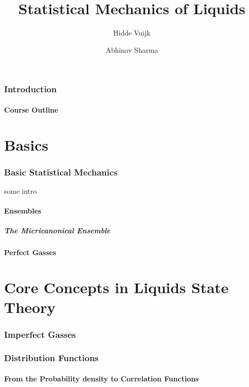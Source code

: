 \documentclass[a4paper,11pt]{article}
\title{Statistical Mechanics of Liquids}
\author[a]{Hidde Vuijk}
\author[a,b]{Abhinav Sharma}
\affiliation[a]{Leibniz-Institut f\"ur Polymerforschung, Dresden, Germany}
\affiliation[b]{TU Dresden}
\begin{document}
 
\maketitle
\flushbottom

\newpage
\section{Introduction}
\subsection{Course Outline}
\newpage
\part{Basics}

\newpage
\section{Basic Statistical Mechanics}\label{sec:basic}

some intro

\subsection{Ensembles}\label{sec:enembles}
\subsubsection{The Micricanonical Ensemble}
\subsection{Perfect Gasses}\label{sec:perfect}
\newpage


\part{Core Concepts in Liquids State Theory}
\section{Imperfect Gasses}\label{sec:imperfect}

\newpage
\section{Distribution Functions}\label{sec:distribution}
\subsection{From the Probability density to Correlation Functions}

\end{document}
